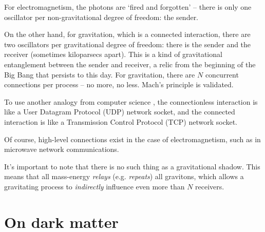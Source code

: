 \documentclass[12pt]{article}
\begin{document}
{For electromagnetism, the photons are `fired and forgotten' -- there is only one oscillator per non-gravitational degree of freedom: the sender.

On the other hand, for gravitation, which is a connected interaction, there are two oscillators per gravitational degree of freedom: there is the sender and the receiver (sometimes kiloparsecs apart).
This is a kind of gravitational entanglement between the sender and receiver, a relic from the beginning of the Big Bang that persists to this day.
For gravitation, there are $N$ concurrent connections per process -- no more, no less.
Mach's principle \cite{misner} is validated.

To use another analogy from computer science \cite{stevens}, the connectionless interaction is like a User Datagram Protocol (UDP) network socket, and the connected interaction is like a Transmission Control Protocol (TCP) network socket.

Of course, high-level connections exist in the case of electromagnetism, such as in microwave network communications.

It's important to note that there is no such thing as a gravitational shadow.
This means that all mass-energy {\textit{relays}} (e.g. {\textit{repeats}}) all gravitons, which allows a gravitating process to {\textit{indirectly}} influence even more than $N$ receivers.





\section{On dark matter}

}
\end{document}
